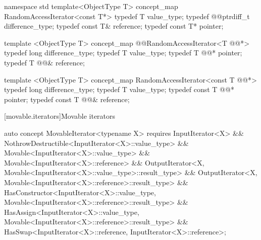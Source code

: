 \documentclass[american,twoside]{book}
\begin{document}

\begin{codeblock}
namespace std {
  template<ObjectType T> concept_map RandomAccessIterator<const T*> {
    typedef T value_type;
    typedef @@ptrdiff_t difference_type;
    typedef const T& reference;
    typedef const T* pointer;
  }
}
\end{codeblock}

\pnum
{}

\color{addclr}
\begin{codeblock}
  template <ObjectType T> concept_map @@RandomAccessIterator<T @@*> {
    typedef long difference_type;
    typedef T value_type;
    typedef T @@* pointer;
    typedef T @@& reference;
  }

  template <ObjectType T> concept_map RandomAccessIterator<const T @@*> {
    typedef long difference_type;
    typedef T value_type;
    typedef const T @@* pointer;
    typedef const T @@& reference;
  }
\end{codeblock}
\textcolor{addclr}{\exitnote}
\color{black}

[movable.iterators]{Movable iterators}
\pnum
{}

\color{ccadd}
\begin{codeblock}
auto concept MovableIterator<typename X> {
  requires InputIterator<X>
        && NothrowDestructible<InputIterator<X>::value_type>
        && Movable<InputIterator<X>::value_type>
        && Movable<InputIterator<X>::reference>
        && OutputIterator<X, Movable<InputIterator<X>::value_type>::result_type>
        && OutputIterator<X, Movable<InputIterator<X>::reference>::result_type>
        && HasConstructor<InputIterator<X>::value_type, 
                          Movable<InputIterator<X>::reference>::result_type>
        && HasAssign<InputIterator<X>::value_type, 
                     Movable<InputIterator<X>::reference>::result_type>
        && HasSwap<InputIterator<X>::reference, InputIterator<X>::reference>;
}
\end{codeblock}
\color{black}
\end{document}
